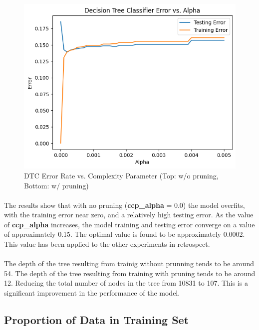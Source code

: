 \documentclass[12pt, letterpaper]{article}
\begin{document}
\begin{figure}[ht]
    \centering
    \includegraphics[width=\textwidth]{dt/dt6.png} %
    \caption{DTC Error Rate vs. Complexity Parameter (Top: w/o pruning,
            Bottom: w/ pruning)}
    \label{fig:dt2}
\end{figure}

\paragraph*{}The results show that with no pruning (\textbf{ccp\_alpha} = 0.0)
the model overfits, with the training error near zero, and a relatively high
testing error. As the value of \textbf{ccp\_alpha} increases, the model
training and testing error converge on a value of approximately 0.15. The optimal
value is found to be approximately 0.0002. This value has been applied to the
other experiments in retrospect.

\paragraph*{}The depth of the tree resulting from trainig without prunning tends
to be around 54. The depth of the tree resulting from training with pruning
tends to be around 12. Reducing the total number of nodes in the tree from
10831 to 107. This is a significant improvement in the performance of the model.

\subsection{Proportion of Data in Training Set}
\end{document}
